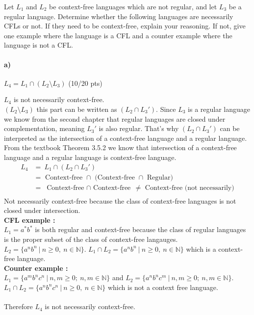 \documentclass[a4paper,12pt]{article}
\begin{document}
Let $L_1$ and $L_2$ be context-free languages which are not regular, and let $L_3$ be a regular language. Determine whether the following languages are necessarily CFLs or not. If they need to be context-free, explain your reasoning. If not, give one example where the language is a CFL and a counter example where the language is not a CFL. \\

\paragraph{a)} $L_4 = L_1 \cap (L_2 \setminus L_3)$ \hfill \small{(10/20 pts)} \\

\begin{tcolorbox}
$L_4$ is not necessarily context-free. \\
$(L_2 \setminus L_3)$ this part can be written as $(L_2 \cap L_3')$. Since $L_3$ is a regular language we know from the second chapter that regular languages are closed under complementation, meaning $L_3'$ is also regular. That's why $(L_2 \cap L_3')$ can be interpreted as the intersection of a context-free language and a regular language. From the textbook Theorem 3.5.2 we know that intersection of a context-free language and a regular language is context-free language. 
\begin{equation}
\begin{split}
L_4 &  = \ L_1 \cap (L_2 \cap L_3') \\
       &  = \text{ Context-free $\cap$ (Context-free $\cap$ Regular)} \\
       &  = \text{ Context-free $\cap$ Context-free}\ \neq \text{ Context-free\ \ (not necessarily)} \\
\end{split}
\end{equation}
Not necessarily context-free because the class of context-free languages is not closed under intersection. \\
\textbf{CFL example : } \\
$L_1=a^*b^*$ is both regular and context-free because the class of regular languages is the proper subset of the class of context-free langauges. $L_2=\{a^nb^n\ |\ n\geq 0,\ n\in \mathbb{N}  \}$. $L_1\cap L_2=\{a^nb^n\ |\ n\geq 0,\ n\in \mathbb{N}  \}$ which is a context-free language. \\
\textbf{Counter example : } \\
$L_1=\{a^mb^nc^n\ |\ n,m\geq 0;\ n,m\in \mathbb{N} \}$ and $L_2=\{a^nb^nc^m\ |\ n,m\geq 0;\ n,m\in \mathbb{N} \}$. $L_1\cap L_2=\{a^nb^nc^n\ |\ n\geq 0,\ n\in \mathbb{N} \}$ which is not a context free language. \\ \\
Therefore $L_4$ is not necessarily context-free.
\end{tcolorbox}
\end{document}
